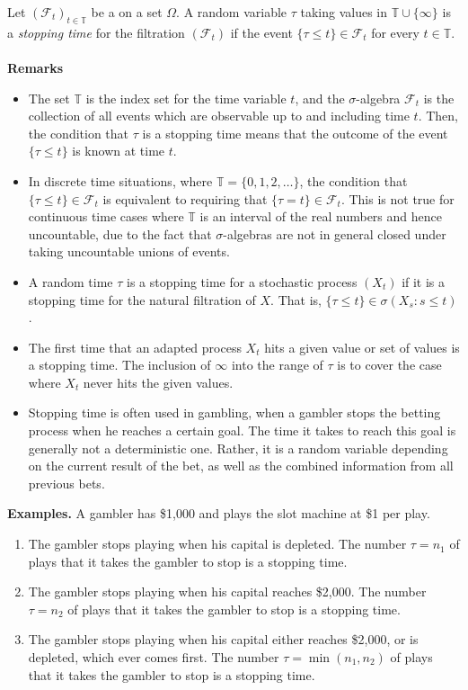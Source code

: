 \documentclass[12pt]{article}
\begin{document}
Let $( \mathcal{F}_t)_{t\in\mathbb{T}}$ be a  on a set $\Omega$.
A  random variable $\tau$ taking values in $\mathbb{T}\cup\{\infty\}$ is a \emph{stopping time} for the filtration $(\mathcal{F}_t)$ if the event $\lbrace \tau\le t \rbrace \in \mathcal{F}_t$ for every $t\in\mathbb{T}$. 
\\\\ 
\textbf{Remarks} 
\begin{itemize}
\item The set $\mathbb{T}$ is the index set for the time variable $t$, and the $\sigma$-algebra $\mathcal{F}_t$ is the collection of all events which are observable up to and including time $t$. Then, the condition that $\tau$ is a stopping time means that the outcome of the event $\{\tau\le t\}$ is known at time $t$.

\item In discrete time situations, where $\mathbb{T}=\{0,1,2,\ldots\}$, the condition that $\{\tau\le t\}\in\mathcal{F}_t$ is equivalent to requiring that $\{\tau=t\}\in\mathcal{F}_t$. This is not true for continuous time cases where $\mathbb{T}$ is an interval of the real numbers and hence uncountable, due to the fact that $\sigma$-algebras are not in general closed under taking uncountable unions of events.

\item A random time $\tau$ is a stopping time for a stochastic process $(X_t)$ if it is a stopping time for the natural filtration of $X$. That is, $\{\tau\le t\}\in\sigma(X_s:s\le t)$.

\item The first time that an adapted process $X_t$ hits a given value or set of values is a stopping time. The inclusion of $\infty$ into the range of $\tau$ is to cover the case where $X_t$ never hits the given values.

\item Stopping time is often used in gambling, when a gambler stops the betting process when he reaches a certain goal.  The time it takes to reach this goal is generally not a deterministic one.  Rather, it is a random variable depending on the current result of the bet, as well as the combined information from all previous bets.  
\end{itemize}
\par
\textbf{Examples.}
A gambler has \$1,000 and plays the slot machine at \$1 per play.
\begin{enumerate}
\item The gambler stops playing when his capital is depleted.  The number $\tau=n_1$ of plays that it takes the gambler to stop is a stopping time.
\item The gambler stops playing when his capital reaches \$2,000.  The number $\tau=n_2$ of plays that it takes the gambler to stop is a stopping time.
\item The gambler stops playing when his capital either reaches \$2,000, or is depleted, which ever comes first.  The number $\tau=\operatorname{min}(n_1,n_2)$ of plays that it takes the gambler to stop is a stopping time.
\end{enumerate}
\end{document}
